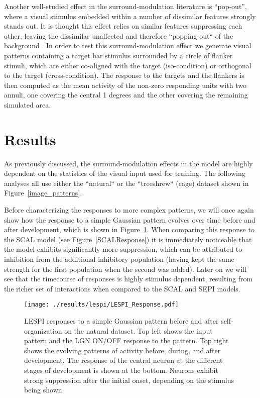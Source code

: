 Another well-studied effect in the surround-modulation
literature is ``pop-out'', where a visual stimulus 
embedded within a number of dissimilar features strongly stands
out. It is thought this effect relies on similar features suppressing
each other, leaving the dissimilar unaffected and therefore
``popping-out`` of the background \citep{Kastner1997}. In order to
test this surround-modulation effect we generate visual patterns
containing a target bar stimulus surrounded by a circle of flanker
stimuli, which are either co-aligned with the target (iso-condition)
or orthogonal to the target (cross-condition).
The response to the targets and the flankers is then computed as the
mean activity of the non-zero responding units with two annuli, one
covering the central 1 degrees and the other covering the remaining
simulated area.

\section{Results}

As previously discussed, the surround-modulation effects in the model
are highly dependent on the statistics of the visual input used for
training. The following analyses all use either the ``natural`` or the
``treeshrew`` (cage) dataset shown in Figure~\ref{image_patterns}.

Before characterizing the responses to more complex patterns, we will
once again show how the response to a simple Gaussian pattern evolves
over time before and after development, which is shown in
Figure~\ref{LESPIResponse}. When comparing this response to the SCAL
model (see Figure~\ref{SCALResponse}) it is immediately noticeable
that the model exhibits significantly more suppression, which can be
attributed to inhibition from the additional inhibitory population
(having kept the same strength for the first population when the
second was added). Later on we will see that the timecourse of
responses is highly stimulus dependent, resulting from the richer set
of interactions when compared to the SCAL and SEPI models.

\begin{figure}
	\centering
    \texttt{[image: ./results/lespi/LESPI\_Response.pdf]}
	\caption[LESPI responses to a simple Gaussian pattern before and
      after self-organization.]{LESPI responses to a simple Gaussian
      pattern before and after self-organization on the natural
      dataset. Top left shows the input pattern and the LGN ON/OFF
      response to the pattern. Top right shows the evolving patterns
      of activity before, during, and after development. The response
      of the central neuron at the different stages of development is
      shown at the bottom. Neurons exhibit strong suppression after
      the initial onset, depending on the stimulus being shown.}
	\label{LESPIResponse}
\end{figure}

